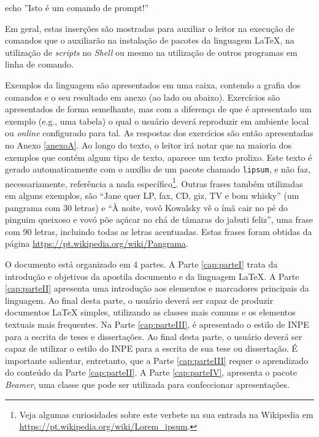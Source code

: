 \begin{meucomando}
echo ''Isto é um comando de prompt!''
\end{meucomando}

Em geral, estas inserções são mostradas para auxiliar o leitor na execução de comandos que o auxiliarão na instalação de pacotes da linguagem \LaTeX{}, na utilização de \textit{scripts} no \textit{Shell} ou mesmo na utilização de outros programas em linha de comando.

Exemplos da linguagem são apresentados em uma caixa, contendo a grafia dos comandos e o seu resultado em anexo (ao lado ou abaixo). Exercícios são apresentados de forma semelhante, mas com a diferença de que é apresentado um exemplo (e.g., uma tabela) o qual o usuário deverá reproduzir em ambiente local ou \textit{online} configurado para tal. As respostas dos exercícios são então apresentadas no Anexo \ref{anexoA}. Ao longo do texto, o leitor irá notar que na maioria dos exemplos que contém algum tipo de texto, aparece um texto prolixo. Este texto é gerado automaticamente com o auxílio de um pacote chamado {\tt lipsum}, e não faz, necessariamente, referência a nada específico\footnote{Veja algumas curiosidades sobre este verbete na sua entrada na Wikipedia em \url{https://pt.wikipedia.org/wiki/Lorem_ipsum}.}. Outras frases também utilizadas em alguns exemplos, são ``Jane quer LP, fax, CD, giz, TV e bom whisky'' (um pangrama com 30 letras) e ``À noite, vovô Kowalsky vê o ímã cair no pé do pinguim queixoso e vovó põe açúcar no chá de tâmaras do jabuti feliz'', uma frase com 90 letras, incluindo todas as letras acentuadas. Estas frases foram obtidas da página \url{https://pt.wikipedia.org/wiki/Pangrama}.

O documento está organizado em 4 partes. A Parte \ref{cap:parteI} trata da introdução e objetivos da apostila documento e da linguagem \LaTeX{}. A Parte \ref{cap:parteII} apresenta uma introdução aos elementos e marcadores principais da linguagem. Ao final desta parte, o usuário deverá ser capaz de produzir documentos \LaTeX{} simples, utilizando as classes mais comuns e os elementos textuais mais frequentes. Na Parte \ref{cap:parteIII}, é apresentado o estilo de INPE para a escrita de teses e dissertações. Ao final desta parte, o usuário deverá ser capaz de utilizar o estilo do INPE para a escrita de sua tese ou dissertação. É importante salientar, entretanto, que a Parte \ref{cap:parteIII} requer o aprendizado do conteúdo da Parte \ref{cap:parteII}. A Parte \ref{cap:parteIV}, apresenta o pacote \textit{Beamer}, uma classe que pode ser utilizada para confeccionar apresentações.

